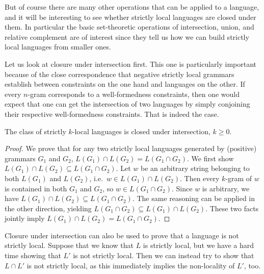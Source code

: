 But of course there are many other operations that can be applied to a language, and it will be interesting to see whether strictly local languages are closed under them.
In particular the basic set-theoretic operations of intersection, union, and relative complement are of interest since they tell us how we can build strictly local languages from smaller ones.

Let us look at closure under intersection first.
This one is particularly important because of the close correspondence that negative strictly local grammars establish between constraints on the one hand and languages on the other.
If every $n$-gram corresponds to a well-formedness constraints, then one would expect that one can get the intersection of two languages by simply conjoining their respective well-formedness constraints.
That is indeed the case.
%
\begin{lemma}
    The class of strictly $k$-local languages is closed under intersection, $k \geq 0$.
\end{lemma}
%
\begin{proof}
    We prove that for any two strictly local languages generated by (positive) grammars $G_1$ and $G_2$, $L(G_1) \cap L(G_2) = L(G_1 \cap G_2)$.
    We first show $L(G_1) \cap L(G_2) \subseteq L(G_1 \cap G_2)$.
    Let $w$ be an arbitrary string belonging to both $L(G_1)$ and $L(G_2)$, i.e.\ $w \in L(G_1) \cap L(G_2)$.
    Then every $k$-gram of $w$ is contained in both $G_1$ and $G_2$, so $w \in L(G_1 \cap G_2)$.
    Since $w$ is arbitrary, we have $L(G_1) \cap L(G_2) \subseteq L(G_1 \cap G_2)$.
    The same reasoning can be applied in the other direction, yielding $L(G_1 \cap G_2) \subseteq L(G_1) \cap L(G_2)$.
    These two facts jointly imply $L(G_1) \cap L(G_2) = L(G_1 \cap G_2)$.
\end{proof}
%
%
Closure under intersection can also be used to prove that a language is not strictly local.
Suppose that we know that $L$ is strictly local, but we have a hard time showing that $L'$ is not strictly local.
Then we can instead try to show that $L \cap L'$ is not strictly local, as this immediately implies the non-locality of $L'$, too.

